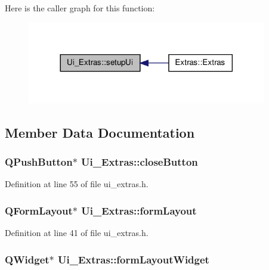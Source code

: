 Here is the caller graph for this function:
\nopagebreak
\begin{figure}[H]
\begin{center}
\leavevmode
\includegraphics[width=296pt]{classUi__Extras_ae9081fb123d2b64bcb3fdf7301707af0_icgraph}
\end{center}
\end{figure}




\subsection{Member Data Documentation}
\hypertarget{classUi__Extras_acf8277aeab1f7813505270ed0e7a5e60}{
\subsubsection[{closeButton}]{\setlength{\rightskip}{0pt plus 5cm}QPushButton$\ast$ {\bf Ui\_\-Extras::closeButton}}}
\label{classUi__Extras_acf8277aeab1f7813505270ed0e7a5e60}


Definition at line 55 of file ui\_\-extras.h.

\hypertarget{classUi__Extras_a82e2d79ca46ef7f7009de5b8364830ee}{
\subsubsection[{formLayout}]{\setlength{\rightskip}{0pt plus 5cm}QFormLayout$\ast$ {\bf Ui\_\-Extras::formLayout}}}
\label{classUi__Extras_a82e2d79ca46ef7f7009de5b8364830ee}


Definition at line 41 of file ui\_\-extras.h.

\hypertarget{classUi__Extras_a4ad0a03d033f96f16367da8b3d8adf3e}{
\subsubsection[{formLayoutWidget}]{\setlength{\rightskip}{0pt plus 5cm}QWidget$\ast$ {\bf Ui\_\-Extras::formLayoutWidget}}}
\label{classUi__Extras_a4ad0a03d033f96f16367da8b3d8adf3e}


